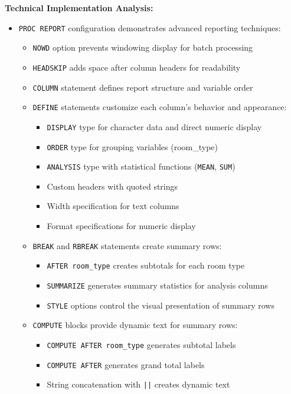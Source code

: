 \documentclass{article}
\begin{document}
\noindent
\textbf{Technical Implementation Analysis:}
\begin{itemize}[leftmargin=*]
    \item \texttt{PROC REPORT} configuration demonstrates advanced reporting techniques:
    \begin{itemize}
        \item \texttt{NOWD} option prevents windowing display for batch processing
        \item \texttt{HEADSKIP} adds space after column headers for readability
        \item \texttt{COLUMN} statement defines report structure and variable order
        \item \texttt{DEFINE} statements customize each column's behavior and appearance:
        \begin{itemize}
            \item \texttt{DISPLAY} type for character data and direct numeric display
            \item \texttt{ORDER} type for grouping variables (room\_type)
            \item \texttt{ANALYSIS} type with statistical functions (\texttt{MEAN}, \texttt{SUM})
            \item Custom headers with quoted strings
            \item Width specification for text columns
            \item Format specifications for numeric display
        \end{itemize}
        \item \texttt{BREAK} and \texttt{RBREAK} statements create summary rows:
        \begin{itemize}
            \item \texttt{AFTER room\_type} creates subtotals for each room type
            \item \texttt{SUMMARIZE} generates summary statistics for analysis columns
            \item \texttt{STYLE} options control the visual presentation of summary rows
        \end{itemize}
        \item \texttt{COMPUTE} blocks provide dynamic text for summary rows:
        \begin{itemize}
            \item \texttt{COMPUTE AFTER room\_type} generates subtotal labels
            \item \texttt{COMPUTE AFTER} generates grand total labels
            \item String concatenation with \texttt{||} creates dynamic text
        \end{itemize}
    \end{itemize}
\end{itemize}
\end{document}
